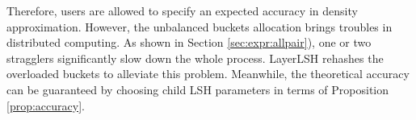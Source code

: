 Therefore, users are allowed to specify an expected accuracy in density approximation. However, the unbalanced buckets allocation brings troubles in distributed computing. As shown in Section \ref{sec:expr:allpair}), one or two stragglers significantly slow down the whole process. LayerLSH rehashes the overloaded buckets to alleviate this problem. Meanwhile, the theoretical accuracy can be guaranteed by choosing child LSH parameters in terms of Proposition \ref{prop:accuracy}.



